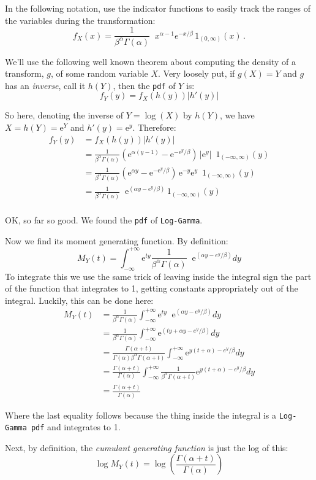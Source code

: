 \documentclass[12pt]{article}
\begin{document}
In the following notation, use the indicator functions to easily track the ranges of the variables during the transformation: 
$$ f_X(x) = \frac{1}{\beta^{\alpha}\Gamma(\alpha)} \;\; x^{\alpha-1} e^{-x/\beta} \, 1_{(0,\infty)}(x) \, . $$

We'll use the following well known theorem about computing the density of a transform, $g$, of some random variable $X$. Very loosely put, if $g(X) = Y$ and $g$ has an \emph{inverse}, call it $h(Y)$, then the \texttt{pdf} of $Y$ is:
$$
f_Y(y) = f_X(h(y)) |h'(y)|
$$

So here, denoting the inverse of $Y = \log (X)$ by $h(Y)$, we have $ X=h(Y)=\mathrm{e}^Y$ and $h'(y) = \mathrm{e}^{y}$. Therefore:
\begin{align*}
 f_Y(y) &= f_X(h(y)) |h'(y)| \\
 &= \frac{1}{\beta^\alpha \Gamma(\alpha)} \left(\mathrm{e}^{\alpha (y - 1)} - \mathrm{e}^{-\mathrm{e}^y/\beta}\right)\,|\mathrm{e}^{y}| \,\,\,1_{(-\infty,\infty)}(y) \\
  &= \frac{1}{\beta^\alpha \Gamma(\alpha)} \left(\mathrm{e}^{\alpha y} - \mathrm{e}^{-\mathrm{e}^y/\beta}\right)\,\mathrm{e}^{-y}\mathrm{e}^{y} \,\,\,1_{(-\infty,\infty)}(y) \\
 &= \frac{1}{\beta^\alpha \Gamma(\alpha)} \;\; \mathrm{e}^{\left(\alpha y - e^y/\beta\right)}\,1_{(-\infty,\infty)}(y) \\
\end{align*}

OK, so far so good. We found the \texttt{pdf} of \texttt{Log-Gamma}. 

Now we find its moment generating function. By definition:
$$
M_Y(t) = \int_{-\infty}^{+\infty} \mathrm{e}^{ty} \frac{1}{\beta^\alpha \Gamma(\alpha)} \;\; \mathrm{e}^{\left(\alpha y - e^y/\beta\right)} dy
$$
To integrate this we use the same trick of leaving inside the integral sign the part of the function that integrates to 1, getting constants appropriately out of the integral. Luckily, this can be done here:
\begin{align*}
M_Y(t) &= \frac{1}{\beta^\alpha \Gamma(\alpha)} \int_{-\infty}^{+\infty} \mathrm{e}^{ty} \;\; \mathrm{e}^{\left(\alpha y - e^y/\beta\right)} dy\\
&= \frac{1}{\beta^\alpha \Gamma(\alpha)} \int_{-\infty}^{+\infty} \mathrm{e}^{\left(ty +\alpha y - e^y/\beta\right)} dy\\
&= \frac{\Gamma(\alpha + t)}{\Gamma(\alpha) \beta^\alpha \Gamma(\alpha + t)} \int_{-\infty}^{+\infty} \mathrm{e}^{y \left(t +\alpha \right) - e^y/\beta} dy\\
&= \frac{\Gamma(\alpha + t)}{\Gamma(\alpha)}  \int_{-\infty}^{+\infty} \frac{1} {\beta^\alpha \Gamma(\alpha + t)}\mathrm{e}^{y \left(t +\alpha \right) - e^y/\beta} dy\\
&= \frac{\Gamma(\alpha + t)}{\Gamma(\alpha)} 
\end{align*}

Where the last equality follows because the thing inside the integral is a \texttt{Log-Gamma pdf} and integrates to 1.

Next, by definition, the \emph{cumulant generating function} is just the log of this:
$$
\log M_Y(t) = \log \left(\frac{\Gamma(\alpha + t)}{\Gamma(\alpha)} \right)
$$
\end{document}
